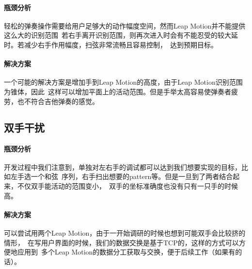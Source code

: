             \paragraph{瓶颈分析}
            轻松的弹奏操作需要给用户足够大的动作幅度空间，然而Leap Motion并不能提供这么大的识别范围\
            若右手离开识别范围，则再次进入时会有不能忍受的较大延时。若减少右手作用幅度，扫弦非常流畅且容易控制，\
            达到预期目标。

            \paragraph{解决方案}
            一个可能的解决方案是增加手到Leap Motion的高度，由于Leap Motion识别范围为锥体，因此\
            这样可以增加平面上的活动范围。但是手举太高容易使弹奏者疲劳，也不符合吉他弹奏的感觉。

        \subsection{双手干扰}
            \paragraph{瓶颈分析}
            开发过程中我们注意到，单独对左右手的调试都可以达到我们想要实现的目标，比如左手选一个和弦\
            序列，右手扫出想要的pattern等。但是一旦到了两者结合起来，不仅双手能活动的范围变小，\
            双手的坐标准确度也没有只有一只手的时候高。

            \paragraph{解决方案}
            可以尝试用两个Leap Motion，由于一开始调研的时候也想到可能双手会比较挤的情形，\
            在写用户界面的时候，我们的数据交换是基于TCP的，这样的方式可以方便地应用到\
            多个Leap Motion的数据分工获取与交换，便于后续工作（如果有的话）。
